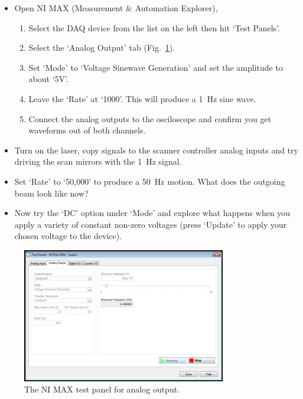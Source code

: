 \documentclass[a4paper]{report}
\begin{document}
\begin{itemize}
    \item Open NI MAX (Measurement \& Automation Explorer),
        \begin{enumerate}
            \setlength\itemsep{0.15em}
            \item Select the DAQ device from the list on the left then hit `Test Panels'. 
            \item Select the `Analog Output' tab (Fig.~\ref{DAQMX}).
            \item Set `Mode' to `Voltage Sinewave Generation' and set the amplitude to about `5V'.
            \item Leave the `Rate' at `1000'. This will produce a 1~Hz sine wave.
            \item Connect the analog outputs to the osciloscope and confirm you get waveforms out of both channels. 
        \end{enumerate}

    \item Turn on the laser, copy signals to the scanner controller analog inputs and try driving the scan mirrors with the 1~Hz signal.  
    \item Set `Rate' to `50,000' to produce a 50~Hz motion. What does the outgoing beam look like now?
    \item Now try the `DC' option under `Mode' and explore what happens when you apply a variety of constant non-zero voltages (press `Update' to apply your chosen voltage to the device).
\end{itemize}


\begin{figure}[h]
\centering
\includegraphics[width=3.5in]{MAX_for_1D.png}
\caption{The NI MAX test panel for analog output.}
\label{DAQMX}
\end{figure}



\clearpage
\end{document}
